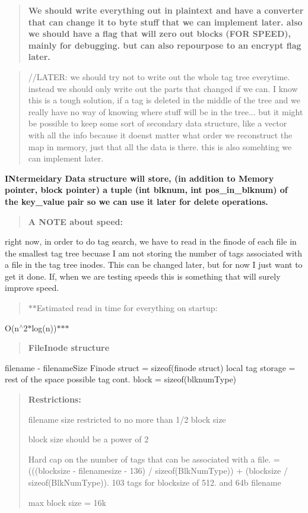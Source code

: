 \begin{quote}
{\bfseries We should write everything out in plaintext and have a converter that can change it to byte stuff that we can implement later. also we should have a flag that will zero out blocks (F\+OR S\+P\+E\+ED), mainly for debugging. but can also repourpose to an encrypt flag later.} \end{quote}


\begin{quote}
//\+L\+A\+T\+ER\+: we should try not to write out the whole tag tree everytime. instead we should only write out the parts that changed if we can. I know this is a tough solution, if a tag is deleted in the middle of the tree and we really have no way of knowing where stuff will be in the tree... but it might be possible to keep some sort of secondary data structure, like a vector with all the info because it doens\textquotesingle{}t matter what order we reconstruct the map in memory, just that all the data is there. this is also somehting we can implement later. \end{quote}
{\bfseries I\+Ntermeidary Data structure will store, (in addition to Memory pointer, block pointer) a tuple (int blknum, int pos\+\_\+in\+\_\+blknum) of the key\+\_\+value pair so we can use it later for delete operations.}

\begin{quote}
{\bfseries A N\+O\+TE about speed\+: }\end{quote}
right now, in order to do tag search, we have to read in the finode of each file in the smallest tag tree becuase I am not storing the number of tags associated with a file in the tag tree inodes. This can be changed later, but for now I just want to get it done. If, when we are testing speeds this is something that will surely improve speed.

{\bfseries \begin{quote}
$\ast$$\ast$\+Estimated read in time for everything on startup\+: \end{quote}
O(n$^\wedge$2$\ast$log(n))$\ast$$\ast$$\ast$}

{\bfseries \begin{quote}
{\bfseries File\+Inode structure }\end{quote}
filename -\/ filename\+Size Finode struct = sizeof(finode struct) local tag storage = rest of the space possible tag cont. block = sizeof(blknum\+Type)}

{\bfseries \begin{quote}
{\bfseries Restrictions\+:}
\begin{DoxyEnumerate}
\item filename size restricted to no more than 1/2 block size
\item block size should be a power of 2
\item Hard cap on the number of tags that can be associated with a file. = (((blocksize -\/ filenamesize -\/ 136) / sizeof(\+Blk\+Num\+Type)) + (blocksize / sizeof(\+Blk\+Num\+Type)). 103 tags for blocksize of 512. and 64b filename
\item max block size = 16k 
\end{DoxyEnumerate}\end{quote}
}

